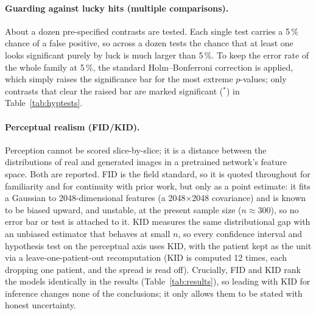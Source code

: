 \documentclass[11pt,a4paper]{article}
\newcommand{\num}[1]{#1}
\begin{document}
\paragraph{Guarding against lucky hits (multiple comparisons).} About a dozen pre-specified
contrasts are tested. Each single test carries a 5\,\% chance of a false positive, so across
a dozen tests the chance that at least one looks significant purely by luck is much larger
than 5\,\%. To keep the error rate of the whole family at 5\,\%, the standard
Holm--Bonferroni correction is applied, which simply raises the significance bar for the most extreme
$p$-values; only contrasts that clear the raised bar are marked significant ($^*$) in
Table~\ref{tab:hyptests}.

\paragraph{Perceptual realism (FID/KID).} Perception cannot be scored slice-by-slice; it is a
distance between the distributions of real and generated images in a pretrained network's
feature space. Both are reported. FID is the field standard, so it is quoted throughout for
familiarity and for continuity with prior work, but only as a point estimate: it fits a Gaussian
to \num{2048}-dimensional features (a \num{2048}$\times$\num{2048} covariance) and is known to be
biased upward, and unstable, at the present sample size ($n\!\approx\!\num{300}$), so no error bar
or test is attached to it. KID measures the same distributional gap with an unbiased estimator
that behaves at small $n$, so every confidence interval and hypothesis test on the
perceptual axis uses KID, with the patient kept as the unit via a leave-one-patient-out
recomputation (KID is computed \num{12} times, each dropping one patient, and the spread is read
off). Crucially, FID and KID rank the models identically in the results
(Table~\ref{tab:results}), so leading with KID for inference changes none of the conclusions; it
only allows them to be stated with honest uncertainty.
\end{document}
